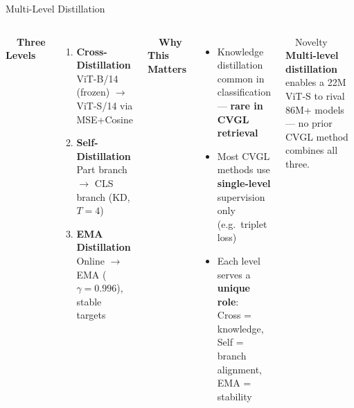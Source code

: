 \documentclass[aspectratio=169, 11pt]{beamer}
\begin{document}
\begin{frame}{Multi-Level Distillation \faFire}
\begin{columns}[T]
\vspace{0.2cm}
{\large \textbf{\faGraduationCap\ \ Three Levels}}
\vspace{0.2cm}

\begin{enumerate}
  \setlength\itemsep{0.6em}
  \item \textbf{Cross-Distillation}\\
    {\small ViT-B/14 (frozen) $\rightarrow$ ViT-S/14 via MSE+Cosine}

  \item \textbf{Self-Distillation}\\
    {\small Part branch $\rightarrow$ CLS branch (KD, $T=4$)}

  \item \textbf{EMA Distillation}\\
    {\small Online $\rightarrow$ EMA ($\gamma=0.996$), stable targets}
\end{enumerate}

\vspace{0.2cm}
{\large \textbf{\faLightbulb\ \ Why This Matters}}
\vspace{0.2cm}

\begin{itemize}\small
  \setlength\itemsep{0.5em}
  \item Knowledge distillation common in classification --- \textbf{rare in CVGL retrieval}
  \item Most CVGL methods use \textbf{single-level} supervision only (e.g.\ triplet loss)
  \item Each level serves a \textbf{unique role}:\\
    Cross = knowledge, Self = branch alignment, EMA = stability
\end{itemize}

\vspace{0.3cm}
\begin{exampleblock}{\faStar\ \ Novelty}
  \small \textbf{Multi-level distillation} enables a 22M ViT-S to rival 86M+ models --- no prior CVGL method combines all three.
\end{exampleblock}
\end{columns}
\end{frame}
\end{document}
